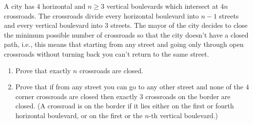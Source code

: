 A city has $4$ horizontal and $n\geq3$ vertical boulevards  which intersect at $4n$ crossroads.
The crossroads divide every horizontal boulevard into $n-1$ streets and every vertical boulevard into $3$ streets.
The mayor of the city decides to close the minimum possible number of crossroads so that the city doesn't have a closed path, i.e., this means that starting from any street and going only through open crossroads without turning back you can't return to the same street.

\begin{enumerate}[label = (\alph*)]
	\item Prove that exactly $n$ crossroads are closed.
	\item Prove that if from any street you can go to any other street and none of the $4$ corner crossroads are closed then exactly $3$ crossroads on the border are closed.
	  (A crossroad is on the border if it lies either on the first or fourth horizontal boulevard, or on the first or the \(n\)-th vertical boulevard.)
\end{enumerate}
